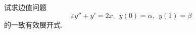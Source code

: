 \begin{problem}[习题7.26]
试求边值问题
\[
\varepsilon y''+y'=2x, ~~y(0)=\alpha, ~~y(1)=\beta
\]
的一致有效展开式.
\end{problem}

\begin{solution}
%
%


\end{solution}
